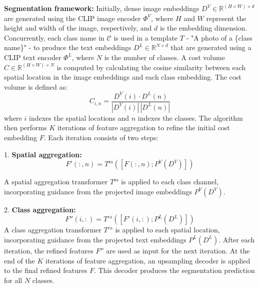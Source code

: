\textbf{Segmentation framework:} 
Initially, dense image embeddings \( D^V \in \mathbb{R}^{(H \times W) \times d} \) are generated using the CLIP image encoder \( \Phi^V \), where \( H \) and \( W \) represent the height and width of the image, respectively, and \( d \) is the embedding dimension. Concurrently, each class name in  \( \mathcal{C} \) is used in a template \( T \) - "A photo of  a \{class name\}" - to produce the text embeddings \( D^L \in \mathbb{R}^{N \times d} \) that are generated using a CLIP text encoder \( \Phi^L \), where \( N \) is the number of classes.
A cost volume \( C \in \mathbb{R}^{(H \times W) \times N} \) is computed by calculating the cosine similarity between each spatial location in the image embeddings and each class embedding. The cost volume is defined as:
\begin{equation}
    C_{i,n} = \frac{D^V(i) \cdot D^L(n)}{|D^V(i)| \, |D^L(n)|}
\end{equation}
where \( i \) indexes the spatial locations and \( n \) indexes the classes.
The algorithm  \cite{cho2024cat} then performs \( K \) iterations of feature aggregation to refine the initial cost embedding \( F \). Each iteration consists of two steps: 

1. \textbf{Spatial aggregation:}
\begin{equation}
    F'(:,n) = T^{\text{sa}}([F(:,n); P^V(D^V)])
\end{equation}

A spatial aggregation transformer \( T^{\text{sa}} \) is applied to each class channel, incorporating guidance from the projected image embeddings \( P^V(D^V) \). 

2. \textbf{Class aggregation:}
\begin{equation}
    F''(i,:) = T^{\text{ca}}([F'(i,:); P^L(D^L)])
\end{equation}
A class aggregation transformer \( T^{\text{ca}} \) is applied to each spatial location, incorporating guidance from the projected text embeddings \( P^L(D^L) \).
After each iteration, the refined features \( F'' \) are used as input for the next iteration.
At the end of the \( K \) iterations of feature aggregation, an upsampling decoder is applied to the final refined features \( F \). This decoder produces the segmentation prediction for all \( N \) classes.

